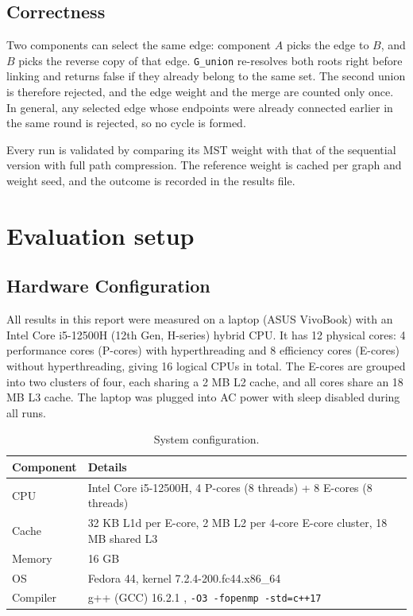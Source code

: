 \documentclass[11pt,a4paper]{article}
\begin{document}
\subsection*{Correctness}
Two components can select the same edge: component $A$ picks the edge to $B$, and $B$ picks the reverse copy of that edge. \texttt{G\_union} re-resolves both roots right before linking and returns false if they already belong to the same set. The second union is therefore rejected, and the edge weight and the merge are counted only once. In general, any selected edge whose endpoints were already connected earlier in the same round is rejected, so no cycle is formed.

Every run is validated by comparing its MST weight with that of the sequential version with full path compression. The reference weight is cached per graph and weight seed, and the outcome is recorded in the results file.

\section*{Evaluation setup}

\subsection*{Hardware Configuration}
All results in this report were measured on a laptop (ASUS VivoBook) with an Intel Core i5-12500H (12th Gen, H-series) hybrid CPU. It has 12 physical cores: 4 performance cores (P-cores) with hyperthreading and 8 efficiency cores (E-cores) without hyperthreading, giving 16 logical CPUs in total. The E-cores are grouped into two clusters of four, each sharing a 2 MB L2 cache, and all cores share an 18 MB L3 cache. The laptop was plugged into AC power with sleep disabled during all runs.

\begin{table}[H]
  \centering
  \small
  \caption{System configuration.}
  \label{tab:system}
  \begin{tabular}{ll}
    \toprule
    \textbf{Component} & \textbf{Details} \\
    \midrule
    CPU       & Intel Core i5-12500H, 4 P-cores (8 threads) + 8 E-cores (8 threads) \\
    Cache     & 32 KB L1d per E-core, 2 MB L2 per 4-core E-core cluster, 18 MB shared L3 \\
    Memory    & 16 GB \\
    OS        & Fedora 44, kernel 7.2.4-200.fc44.x86\_64 \\
    Compiler  & g++ (GCC) 16.2.1 , \texttt{-O3 -fopenmp -std=c++17} \\
    \bottomrule
  \end{tabular}
\end{table}
\end{document}
